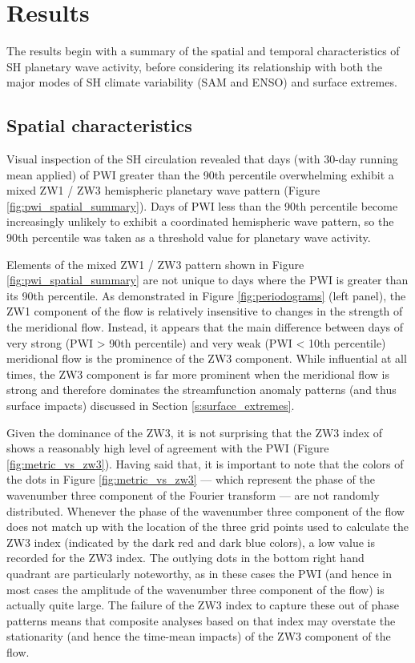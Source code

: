 \section{Results}

The results begin with a summary of the spatial and temporal characteristics of SH planetary wave activity, before considering its relationship with both the major modes of SH climate variability (SAM and ENSO) and surface extremes. 

\subsection{Spatial characteristics}\label{s:spatial_characteristics}

Visual inspection of the SH circulation revealed that days (with 30-day running mean applied) of PWI greater than the 90th percentile overwhelming exhibit a mixed ZW1 / ZW3 hemispheric planetary wave pattern (Figure \ref{fig:pwi_spatial_summary}). Days of PWI less than the 90th percentile become increasingly unlikely to exhibit a coordinated hemispheric wave pattern, so the 90th percentile was taken as a threshold value for planetary wave activity. 

Elements of the mixed ZW1 / ZW3 pattern shown in Figure \ref{fig:pwi_spatial_summary} are not unique to days where the PWI is greater than its 90th percentile. As demonstrated in Figure \ref{fig:periodograms} (left panel), the ZW1 component of the flow is relatively insensitive to changes in the strength of the meridional flow. Instead, it appears that the main difference between days of very strong (PWI > 90th percentile) and very weak (PWI < 10th percentile) meridional flow is the prominence of the ZW3 component. While influential at all times, the ZW3 component is far more prominent when the meridional flow is strong and therefore dominates the streamfunction anomaly patterns (and thus surface impacts) discussed in Section \ref{s:surface_extremes}.

Given the dominance of the ZW3, it is not surprising that the ZW3 index of \citet{Raphael2004} shows a reasonably high level of agreement with the PWI (Figure \ref{fig:metric_vs_zw3}). Having said that, it is important to note that the colors of the dots in Figure \ref{fig:metric_vs_zw3} --- which represent the phase of the wavenumber three component of the Fourier transform --- are not randomly distributed. Whenever the phase of the wavenumber three component of the flow does not match up with the location of the three grid points used to calculate the ZW3 index (indicated by the dark red and dark blue colors), a low value is recorded for the ZW3 index. The outlying dots in the bottom right hand quadrant are particularly noteworthy, as in these cases the PWI (and hence in most cases the amplitude of the wavenumber three component of the flow) is actually quite large. The failure of the ZW3 index to capture these out of phase patterns means that composite analyses based on that index may overstate the stationarity (and hence the time-mean impacts) of the ZW3 component of the flow.